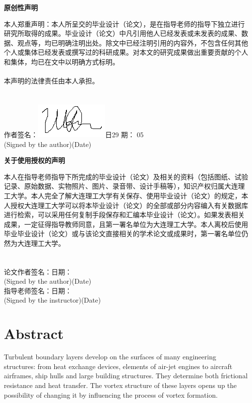 \documentclass[12pt, a4paper]{article}
\newcommand{\anonsection}[1]{\section*{#1}\addcontentsline{toc}{section}{#1}}
\begin{document}
	\newpage
	\pagestyle{fancy}
	\fancyfoot[C]{-\thepage-}
	\begin{center}
		\textbf{原创性声明}
	\end{center}

	本人郑重声明：本人所呈交的毕业设计（论文），是在指导老师的指导下独立进行研究所取得的成果。毕业设计（论文）中凡引用他人已经发表或未发表的成果、数据、观点等，均已明确注明出处。除文中已经注明引用的内容外，不包含任何其他个人或集体已经发表或撰写过的科研成果。对本文的研究成果做出重要贡献的个人和集体，均已在文中以明确方式标明。
	\\\\
	本声明的法律责任由本人承担。
	~~~
	\\
	~~~
	\\
	~~~
	\\
	作者签名：\includegraphics[width=0.1\linewidth]{../Assets/Signature}日29  期： 05\\                 
	(Signed by the author)\hspace{40pt}(Date)
	\newpage
	\begin{center}
		\textbf{关于使用授权的声明}
	\end{center}
	本人在指导老师指导下所完成的毕业设计（论文）及相关的资料（包括图纸、试验记录、原始数据、实物照片、图片、录音带、设计手稿等），知识产权归属大连理工大学。本人完全了解大连理工大学有关保存、使用毕业设计（论文）的规定，本人授权大连理工大学可以将本毕业设计（论文）的全部或部分内容编入有关数据库进行检索，可以采用任何复制手段保存和汇编本毕业设计（论文）。如果发表相关成果，一定征得指导教师同意，且第一署名单位为大连理工大学。本人离校后使用毕业毕业设计（论文）或与该论文直接相关的学术论文或成果时，第一署名单位仍然为大连理工大学。
	~~~
	\\
	~~~
	\\
	~~~
	\\
	论文作者签名：\hspace{110pt}日\hspace{10pt}期：\\               
	(Signed by the author)\hspace{70pt}(Date)\\
	指导老师签名：\hspace{110pt}日\hspace{10pt}期：\\                
	(Signed by the instructor)\hspace{50pt}(Date)
	\newpage
	\tableofcontents
	\newpage
	\anonsection{Abstract}
	Turbulent boundary layers develop on the surfaces of many engineering structures: from heat exchange devices, elements of air-jet engines to aircraft airframes, ship hulls and large building structures. They determine both frictional resistance and heat transfer. The vortex structure of these layers opens up the possibility of changing it by influencing the process of vortex formation.
	
\end{document}
